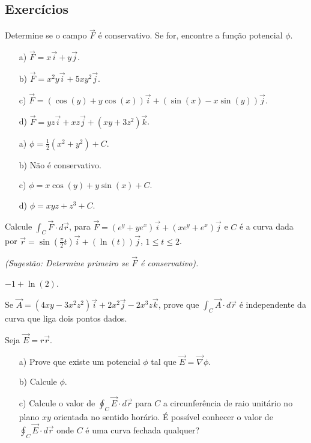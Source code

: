 \subsection*{Exercícios}
\begin{exer}Determine se o campo $\vec{F}$ é conservativo. Se for, encontre a função potencial $\phi$.
 \begin{itemize}
  \item[a)] $\vec{F}=x\vec{i}+y\vec{j}$.
  \item[b)] $\vec{F}=x^2y\vec{i}+5xy^2\vec{j}$.
  \item[c)] $\vec{F}=(\cos(y)+y\cos(x))\vec{i}+(\sin(x)-x\sin(y))\vec{j}$.
  \item[d)] $\vec{F}=yz\vec{i}+xz\vec{j}+(xy+3z^2)\vec{k}$.
 \end{itemize}
 \end{exer}
\begin{resp}
  \begin{itemize}
  \item[a)] $\phi=\frac{1}{2}\left(x^2+y^2\right)+C$.
  \item[b)] Não é conservativo.
  \item[c)] $\phi=x\cos(y)+y\sin(x)+C$.
  \item[d)] $\phi=xyz+z^3+C$.
 \end{itemize}
\end{resp}

\begin{exer}
 Calcule $\int_C\vec{F}\cdot d\vec{r}$, para $\vec{F}=(e^y+ye^x)\vec{i}+(xe^y+e^x)\vec{j}$ e $C$ é a curva dada por $\vec{r}=\sin\left(\frac{\pi}{2}t\right)\vec{i}+(\ln(t))\vec{j}$, $1\leq t\leq 2$. 
 
 {\it (Sugestão: Determine primeiro se $\vec{F}$ é conservativo).}
\end{exer}
\begin{resp}
 $-1+\ln(2)$.
\end{resp}

\begin{exer}Se $\vec{A}=(4xy-3x^2z^2)\vec{i}+2x^2\vec{j}-2x^3z\vec{k}$, prove que $\int_C\vec{A}\cdot d\vec{r}$ é independente da curva que liga dois pontos dados. 
\end{exer}
\begin{exer}Seja $\vec{E}=r\vec{r}$.
 \begin{itemize}
  \item[a)] Prove que existe um potencial $\phi$ tal que $\vec{E}=\vec{\nabla}\phi$.
  \item[b)] Calcule $\phi$.
  \item[c)] Calcule o valor de $\oint_C\vec{E}\cdot d\vec{r}$ para $C$ a circunferência de raio unitário no plano $xy$ orientada no sentido horário. É possível conhecer o valor de $\oint_C\vec{E}\cdot d\vec{r}$ onde $C$ é uma curva fechada qualquer? \end{itemize}
\end{exer}

